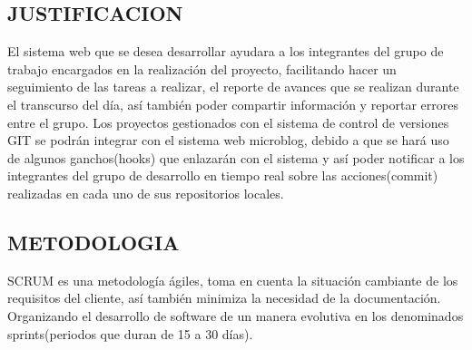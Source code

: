 \subsection{JUSTIFICACION}
El sistema web que se desea desarrollar ayudara  a los integrantes del grupo de trabajo encargados en la realización del proyecto, facilitando hacer un seguimiento de las tareas a realizar, el reporte de avances que se realizan durante el transcurso del día, así también poder compartir información y reportar errores entre el grupo.
Los proyectos gestionados con el sistema de control de versiones GIT se podrán integrar con el sistema web microblog, debido a que se hará uso de algunos ganchos(hooks) que enlazarán con el sistema y así poder notificar a los integrantes del grupo de desarrollo en tiempo real sobre las acciones(commit) realizadas en cada uno de sus repositorios locales.
\subsection{METODOLOGIA}
SCRUM es una metodología ágiles, toma en cuenta la situación cambiante de los requisitos del cliente, así también minimiza la necesidad de la documentación.
Organizando el desarrollo de software de un manera evolutiva en los denominados sprints(periodos que duran de 15 a 30 días).


%
